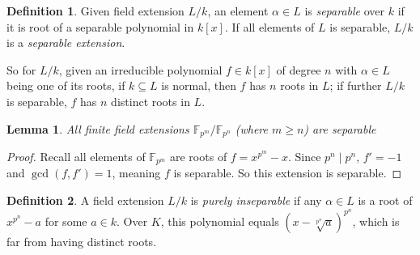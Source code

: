 \documentclass[12pt]{article}
\newtheorem{lemma}{Lemma}[subsection]
\theoremstyle{remark}
\theoremstyle{definition}
\newtheorem{definition}{Definition}[subsection]
\newcommand{\F}[0]{\mathbb{F}}
\begin{document}
        \begin{definition}%
            Given field extension $L/k$, an element $\alpha \in L$ is \textit{separable} over $k$ if it is root of a separable polynomial in $k[x]$. If all elements of $L$ is separable, $L/k$ is a \textit{separable extension}. 
        \end{definition}
        \noindent So for $L/k$, given an irreducible polynomial $f \in k[x]$ of degree $n$ with $\alpha \in L$ being one of its roots, if $k \subseteq L$ is normal, then $f$ has $n$ roots in $L$; if further $L/k$ is separable, $f$ has $n$ distinct roots in $L$.
        \begin{lemma}%
            All finite field extensions $\F_{p^m}/\F_{p^n}$ (where $m\geqslant n$) are separable
        \end{lemma}
        \begin{proof}
            Recall all elements of $\F_{p^m}$ are roots of $f=x^{p^m} - x$. Since $p^n\mid p^n$, $f' = -1$ and $\gcd(f, f') = 1$, meaning $f$ is separable. So this extension is separable.
        \end{proof}
        
        \begin{definition}%
            A field extension $L/k$ is \textit{purely inseparable} if any $\alpha \in L$ is a root of $x^{p^n} - a$ for some $a \in k$. Over $K$, this polynomial equals $\left(x-\sqrt[p^n]{a}\right)^{p^n}$, which is far from having distinct roots. 
        \end{definition}
        
\end{document}
